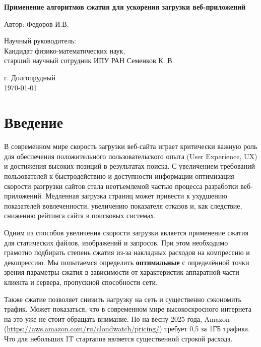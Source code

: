\documentclass[12pt]{article}
\begin{document}
\begin{titlepage}
    \centering
    \vspace*{2cm}

    {\LARGE\bfseries Применение алгоритмов сжатия для ускорения загрузки веб-приложений\par}
    \vspace{1cm}

    {\large Автор: Федоров И.В.\par}
    \vspace{1.5cm}

    {\large Научный руководитель: \\ Кандидат физико-математических наук,\\ старший научный сотрудник ИПУ РАН Семенков К. В.\par}
    \vspace{2cm}

    {\large г. Долгопрудный \\ \today\par}

\end{titlepage}

\tableofcontents

\newpage

\section{Введение}

В современном мире скорость загрузки веб-сайта играет критически важную роль для обеспечения положительного пользовательского опыта (User Experience, UX)
и достижения высоких позиций в результатах поиска. С увеличением требований пользователей к быстродействию и доступности информации оптимизация
скорости разгрузки сайтов стала неотъемлемой частью процесса разработки веб-приложений.
Медленная загрузка страниц может привести к ухудшению показателей вовлеченности, увеличению показателя отказов и, как следствие,
снижению рейтинга сайта в поисковых системах.

Одним из способов увеличения скорости загрузки является применение сжатия для статических файлов, изображений и запросов. При этом необходимо грамотно подбирать степень сжатия
из-за накладных расходов на компрессию и декопрессию. Мы попытаемся определить \textbf{оптимальные} с определённой точки зрения параметры сжатия в зависимости от характеристик
аппаратной части клиента и сервера, пропускной способности сети.

Также сжатие позволяет снизить нагрузку на сеть и существенно сэкономить трафик. Может показаться,
что в современном мире высокоскросного интернета на это уже не стоит обращать внимание.
Но на весну 2025 года, Amazon (\url{https://aws.amazon.com/ru/cloudwatch/pricing/}) требует 0,5\text{\$} за 1ГБ трафика. Что для небольших IT стартапов является существенной строкой расхода.
\end{document}
